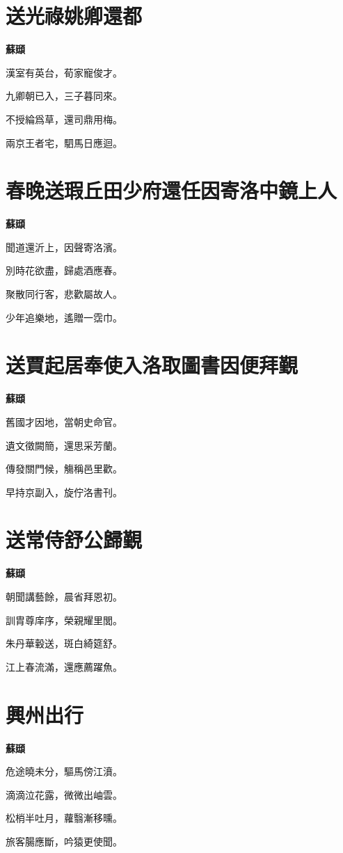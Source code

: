 \documentclass[12pt,a4paper]{ctexbook}
\begin{document}
\section{送光祿姚卿還都}
\textbf{蘇頲}\par\vspace{0.5em}
漢室有英台，荀家寵俊才。\par
九卿朝已入，三子暮同來。\par
不授綸爲草，還司鼎用梅。\par
兩京王者宅，駟馬日應迴。\par

\section{春晚送瑕丘田少府還任因寄洛中鏡上人}
\textbf{蘇頲}\par\vspace{0.5em}
聞道還沂上，因聲寄洛濱。\par
別時花欲盡，歸處酒應春。\par
聚散同行客，悲歡屬故人。\par
少年追樂地，遙贈一霑巾。\par

\section{送賈起居奉使入洛取圖書因便拜覲}
\textbf{蘇頲}\par\vspace{0.5em}
舊國才因地，當朝史命官。\par
遺文徵闕簡，還思采芳蘭。\par
傳發關門候，觴稱邑里歡。\par
早持京副入，旋佇洛書刊。\par

\section{送常侍舒公歸覲}
\textbf{蘇頲}\par\vspace{0.5em}
朝聞講藝餘，晨省拜恩初。\par
訓胄尊庠序，榮親耀里閭。\par
朱丹華轂送，斑白綺筵舒。\par
江上春流滿，還應薦躍魚。\par

\section{興州出行}
\textbf{蘇頲}\par\vspace{0.5em}
危途曉未分，驅馬傍江濆。\par
滴滴泣花露，微微出岫雲。\par
松梢半吐月，蘿翳漸移曛。\par
旅客腸應斷，吟猿更使聞。\par
\end{document}
